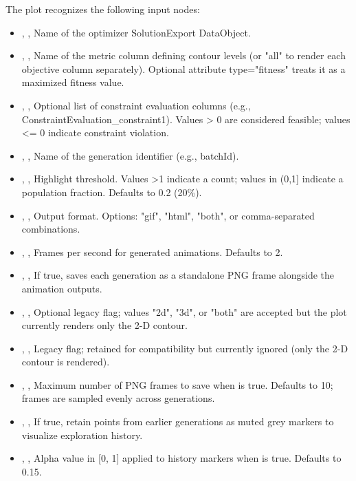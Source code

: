 The  plot recognizes the following input nodes:
\begin{itemize}
  \item {}, , Name of the optimizer SolutionExport DataObject.
  \item {}, , Name of the metric column defining contour levels (or "all" to render each objective column separately). Optional attribute type="fitness" treats it as a maximized fitness value.
  \item {}, , Optional list of constraint evaluation columns (e.g., ConstraintEvaluation\_constraint1). Values \textgreater{} 0 are considered feasible; values \textless{}= 0 indicate constraint violation.
  \item {}, , Name of the generation identifier (e.g., batchId).
  \item {}, , Highlight threshold. Values \textgreater{}1 indicate a count; values in (0,1] indicate a population fraction. Defaults to 0.2 (20\%).
  \item {}, , Output format. Options: "gif", "html", "both", or comma-separated combinations.
  \item {}, , Frames per second for generated animations. Defaults to 2.
  \item {}, , If true, saves each generation as a standalone PNG frame alongside the animation outputs.
  \item {}, , Optional legacy flag; values "2d", "3d", or "both" are accepted but the plot currently renders only the 2-D contour.
  \item {}, , Legacy flag; retained for compatibility but currently ignored (only the 2-D contour is rendered).
  \item {}, , Maximum number of PNG frames to save when  is true. Defaults to 10; frames are sampled evenly across generations.
  \item {}, , If true, retain points from earlier generations as muted grey markers to visualize exploration history.
  \item {}, , Alpha value in [0, 1] applied to history markers when  is true. Defaults to 0.15.

\end{itemize}

